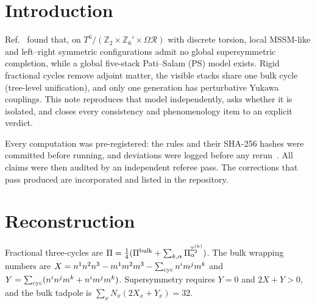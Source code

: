 \documentclass[aps,prd,twocolumn,superscriptaddress,nofootinbib,showkeys]{revtex4-2}
\begin{document}
\maketitle

\section{Introduction}
Ref.~\cite{HRS} found that, on $T^6/(\mathbb{Z}_2\times\mathbb{Z}_6'\times\Omega\mathcal R)$ with discrete torsion, local MSSM-like and left--right symmetric configurations admit no global supersymmetric completion, while a global five-stack Pati--Salam (PS) model exists. Rigid fractional cycles remove adjoint matter, the visible stacks share one bulk cycle (tree-level unification), and only one generation has perturbative Yukawa couplings. This note reproduces that model independently, asks whether it is isolated, and closes every consistency and phenomenology item to an explicit verdict.

Every computation was pre-registered: the rules and their SHA-256 hashes were committed before running, and deviations were logged before any rerun~\cite{repo}. All claims were then audited by an independent referee pass. The corrections that pass produced are incorporated and listed in the repository.

\section{Reconstruction}
Fractional three-cycles are $\Pi=\tfrac14(\Pi^{\rm bulk}+\sum_{k,\alpha}\Pi^{\mathbb Z_2^{(k)}}_\alpha)$. The bulk wrapping numbers are $X=n^1n^2n^3-m^1m^2m^3-\sum_{\rm cyc}n^im^jm^k$ and $Y=\sum_{\rm cyc}(n^in^jm^k+n^im^jm^k)$. Supersymmetry requires $Y=0$ and $2X+Y>0$, and the bulk tadpole is $\sum_x N_x(2X_x+Y_x)=32$.
\end{document}
